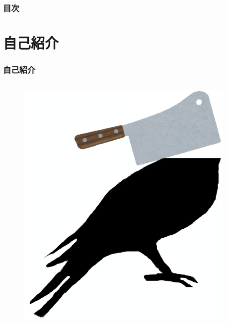\frame{\maketitle}

\begin{frame}
  \frametitle{目次}

  \tableofcontents
\end{frame}

\section{自己紹介}
\begin{frame}
  \frametitle{自己紹介}
  
  \begin{columns}
    \begin{column}{0.4\textwidth}
      \begin{center}
        \begin{figure}
          \includegraphics[width=0.95\textwidth]{img/bird2x_big_gifu.png}
        \end{figure}
      \end{center}
 

\end{column}
\end{columns}
\end{frame}
